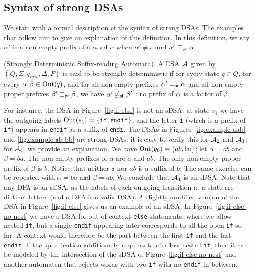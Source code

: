 \subsection{Syntax of strong DSAs}
\label{sec:sDSA-syntax}

We start with a formal description of the syntax of strong DSAs. The examples that follow aim to give an explanation of this definition. In this definition, we say $\alpha'$ is a non-empty prefix of a word $\alpha$ when $\alpha' \neq \epsilon$ and $\alpha' \sqsubseteq_{\mathsf {pr}} \alpha$. 

\begin{definition}[sDSA]\label{def:str-suff-reading-aut}
(Strongly Deterministic Suffix-reading Automata). A DSA $\mathcal{A}$ given by $(Q, \Sigma, q_{init}, \Delta, F)$ is said to be strongly deterministic if for every state $q \in Q$, for every $\alpha, \beta \in \operatorname{Out} (q)$, and for all non-empty prefixes $\alpha' \sqsubseteq_{\mathsf {pr}} \alpha$ and all non-empty proper prefixes $\beta' \sqsubset_{\mathsf {pr}} \beta$, we have $\alpha' \not \sqsubseteq_{\mathsf {sf}} \beta'$ : no prefix of $\alpha$ is a factor of $\beta$.
\end{definition}

For instance, the DSA in Figure~\ref{fig:if-else} is not an sDSA: at state $s_1$ we have the outgoing labels $\operatorname{Out}(s_1) =\{ \text{\texttt{if}}, \text{\texttt{endif}}\}$, and the letter \texttt{i} (which is a prefix of \texttt{if}) appears in \texttt{endif} as a suffix  of \texttt{endi}. The DSAs in Figures~\ref{fig:example-aab} and \ref{fig:example-ab-bb} are strong DSAs: it is easy to verify this for $\mathcal{A}_2$ and $\mathcal{A}_3$; for $\mathcal{A}_4$, we provide an explanation. We have $\operatorname{Out}(q_0) = \{ab , ba\}$; let $\alpha = ab$ and $\beta= ba$. The non-empty prefixes of $\alpha$ are $a$ and $ab$. The only non-empty proper prefix of $\beta$ is $b$. Notice that neither $a$ nor $ab$ is a suffix of $b$. The same exercise can be repeated with $\alpha = ba$ and $\beta = ab$. We conclude that $\mathcal{A}_4$ is an sDSA. Note that any DFA is an sDSA, as the labels of each outgoing transition at a state are distinct letters (and a DFA is a valid DSA). A slightly modified version of the DSA in Figure~\ref{fig:if-else} gives us an example of an sDSA. In Figure~\ref{fig:if-else-no-nest} we have a DSA for out-of-context \texttt{else} statements, where we allow nested \texttt{if}, but a single \texttt{endif} appearing later corresponds to all the open \texttt{if} so far. A context would therefore be the part between the first \texttt{if} and the last \texttt{endif}. If the specification additionally requires to disallow nested \texttt{if}, then it can be modeled by the intersection of the sDSA of Figure~\ref{fig:if-else-no-nest} and another automaton that rejects words with two \texttt{if} with no \texttt{endif} in between.

